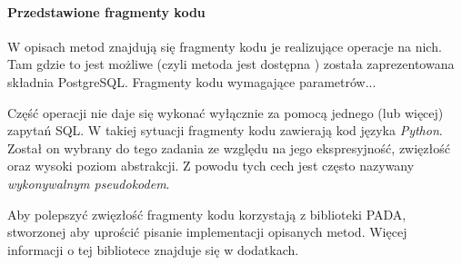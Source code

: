 \paragraph{Przedstawione fragmenty kodu} 
W opisach metod znajdują się fragmenty kodu je realizujące operacje na nich. 
Tam gdzie to jest możliwe (czyli metoda jest dostępna ) została zaprezentowana składnia PostgreSQL.
Fragmenty kodu  wymagające parametrów...

Część operacji nie daje się wykonać wyłącznie za pomocą jednego (lub więcej) zapytań SQL.
W takiej sytuacji fragmenty kodu zawierają kod języka \emph{Python}.
Został on wybrany do tego zadania ze względu na jego ekspresyjność, zwięzłość oraz wysoki poziom abstrakcji.
Z powodu tych cech jest często nazywany \emph{wykonywalnym pseudokodem}.

Aby polepszyć zwięzłość fragmenty kodu korzystają z biblioteki PADA, stworzonej aby uprościć pisanie implementacji opisanych metod. 
Więcej informacji o tej bibliotece znajduje się w dodatkach.








